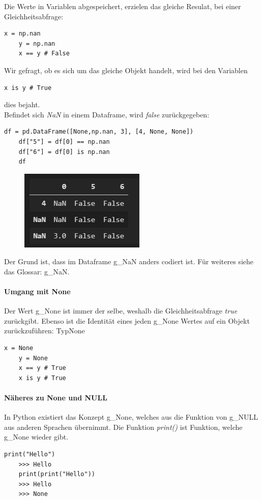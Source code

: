 Die Werte in Variablen abgespeichert, erzielen das gleiche Resulat, bei einer Gleichheitsabfrage:
\begin{lstlisting}[style=Python]
	x = np.nan
	y = np.nan
	x == y # False
\end{lstlisting}
Wir gefragt, ob es sich um das gleiche Objekt  handelt, wird bei den Variablen 
\begin{lstlisting}[style=Python]
	x is y # True
\end{lstlisting}
dies bejaht. \\

Befindet sich \textit{NaN} in einem Dataframe, wird \textit{false} zurückgegeben:
\begin{lstlisting}[style=Python]
	df = pd.DataFrame([None,np.nan, 3], [4, None, None])
	df["5"] = df[0] == np.nan
	df["6"] = df[0] is np.nan
	df
\end{lstlisting}

\begin{figure}[H]
	\centering
	\includegraphics[scale = 0.8]{attachment/chapter_4/Scc009}
\end{figure}
Der Grund ist, dass im Dataframe \gls{g_NaN} anders codiert ist. Für weiteres siehe das Glossar: \gls{g_NaN}.

\paragraph{Umgang mit None}
Der Wert \gls{g_None} ist immer der selbe, weshalb die Gleichheitsabfrage \textit{true} zurückgibt. Ebenso ist die Identität eines jeden \gls{g_None} Wertes auf ein Objekt zurückzuführen: TypNone
\begin{lstlisting}[style=Python]
	x = None
	y = None
	x == y # True
	x is y # True
\end{lstlisting}

\paragraph{Näheres zu None und NULL}
In Python existiert das Konzept \gls{g_None}, welches aus die Funktion von \gls{g_NULL} aus anderen Sprachen übernimmt. Die Funktion \textit{print()} ist Funktion, welche \gls{g_None} wieder gibt. 
\begin{lstlisting}[style=Python]
	print("Hello")
	>>> Hello
	print(print("Hello"))
	>>> Hello
	>>> None
\end{lstlisting}

